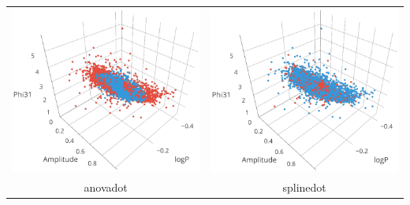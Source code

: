 \begin{longtable}{ c c }
	\includegraphics[width=0.3\paperwidth]{images/ksvm_anovadot.png} & \includegraphics[width=0.3\paperwidth]{images/ksvm_splinedot.png} \\
	anovadot & splinedot \\
\end{longtable}

